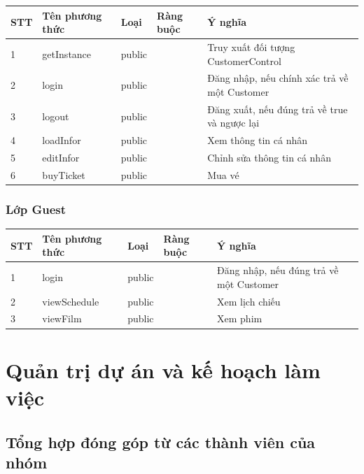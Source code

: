\documentclass[a4paper, 12pt]{article}
\begin{document}
\begin{table}[H]
\centering
\begin{tabular}{|l|l|l|l|l|}
\hline
STT & Tên phương thức & Loại   & Ràng buộc & Ý nghĩa                                      \\ \hline
1   & getInstance     & public &           & Truy xuất đối tượng CustomerControl          \\ \hline
2   & login           & public &           & Đăng nhập, nếu chính xác trả về một Customer \\ \hline
3   & logout          & public &           & Đăng xuất, nếu đúng trả về true và ngược lại \\ \hline
4   & loadInfor       & public &           & Xem thông tin cá nhân                        \\ \hline
5   & editInfor       & public &           & Chỉnh sửa thông tin cá nhân                  \\ \hline
6   & buyTicket       & public &           & Mua vé                                       \\ \hline
\end{tabular}
\end{table}

\subsubsection{Lớp Guest}
\begin{table}[H]
\centering
\begin{tabular}{|l|l|l|l|l|}
\hline
STT & Tên phương thức & Loại   & Ràng buộc & Ý nghĩa                                 \\ \hline
1   & login           & public &           & Đăng nhập, nếu đúng trả về một Customer \\ \hline
2   & viewSchedule    & public &           & Xem lịch chiếu                          \\ \hline
3   & viewFilm        & public &           & Xem phim                                \\ \hline
\end{tabular}
\end{table}

\clearpage

\section{Quản trị dự án và kế hoạch làm việc}

\subsection{Tổng hợp đóng góp từ các thành viên của nhóm}
\end{document}
